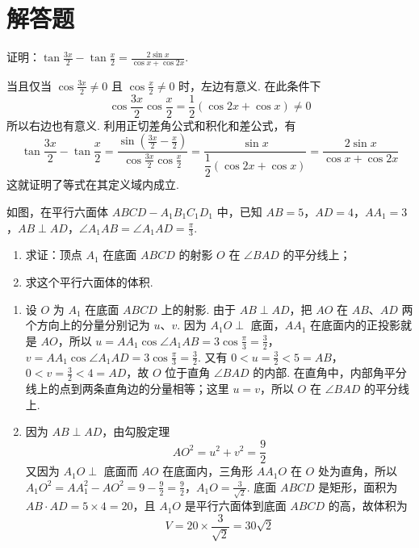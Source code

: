 \documentclass[UTF8,a4paper,oneside,11pt]{ctexbook}
\begin{document}
\section{解答题}

\begin{problem}
证明：\(\tan \frac{3x}{2} - \tan \frac{x}{2} = \frac{2\sin x}{\cos x + \cos 2x}\).
\end{problem}

\begin{solution}
当且仅当 \(\cos\frac{3x}{2}\neq0\) 且 \(\cos\frac{x}{2}\neq0\) 时，左边有意义. 在此条件下
\[
\cos\frac{3x}{2}\cos\frac{x}{2}
=\frac12\left(\cos 2x+\cos x\right)\neq0
\]
所以右边也有意义. 利用正切差角公式和积化和差公式，有
\[
\tan \frac{3x}{2} - \tan \frac{x}{2} = \frac{\sin\left(\frac{3x}{2}-\frac{x}{2}\right)}{\cos\frac{3x}{2}\cos\frac{x}{2}} = \frac{\sin x}{\dfrac{1}{2}\left(\cos 2x+\cos x\right)} = \frac{2\sin x}{\cos x+\cos 2x}
\]
这就证明了等式在其定义域内成立.
\end{solution}

\begin{problem}
如图，在平行六面体 \(ABCD - A_1B_1C_1D_1\) 中，已知 \(AB = 5\)，\(AD = 4\)，\(AA_1 = 3\)，\(AB \perp AD\)，\(\angle A_1AB = \angle A_1AD = \frac{\pi}{3}\).
\begin{enumerate}
\item 求证：顶点 \(A_1\) 在底面 \(ABCD\) 的射影 \(O\) 在 \(\angle BAD\) 的平分线上；
\item 求这个平行六面体的体积.
\end{enumerate}

\end{problem}

\begin{solution}
\begin{enumerate}
\item 设 \(O\) 为 \(A_1\) 在底面 \(ABCD\) 上的射影. 由于 \(AB\perp AD\)，把 \(AO\) 在 \(AB\)、\(AD\) 两个方向上的分量分别记为 \(u\)、\(v\). 因为 \(A_1O\perp\) 底面，\(AA_1\) 在底面内的正投影就是 \(AO\)，所以
\(u=AA_1\cos\angle A_1AB=3\cos\frac{\pi}{3}=\frac{3}{2}\)，\(v=AA_1\cos\angle A_1AD=3\cos\frac{\pi}{3}=\frac{3}{2}\).
又有 \(0<u=\frac32<5=AB\)，\(0<v=\frac32<4=AD\)，故 \(O\) 位于直角 \(\angle BAD\) 的内部. 在直角中，内部角平分线上的点到两条直角边的分量相等；这里 \(u=v\)，所以 \(O\) 在 \(\angle BAD\) 的平分线上.

\item 因为 \(AB\perp AD\)，由勾股定理
\[
AO^2=u^2+v^2=\frac{9}{2}
\]
又因为 \(A_1O\perp\) 底面而 \(AO\) 在底面内，三角形 \(AA_1O\) 在 \(O\) 处为直角，所以
\(A_1O^2=AA_1^2-AO^2=9-\frac{9}{2}=\frac{9}{2}\)，\(A_1O=\frac{3}{\sqrt{2}}\).
底面 \(ABCD\) 是矩形，面积为 \(AB\cdot AD=5\times4=20\)，且 \(A_1O\) 是平行六面体到底面 \(ABCD\) 的高，故体积为
\[
V=20\times\frac{3}{\sqrt{2}}=30\sqrt{2}
\]
\end{enumerate}
\end{solution}
\end{document}
